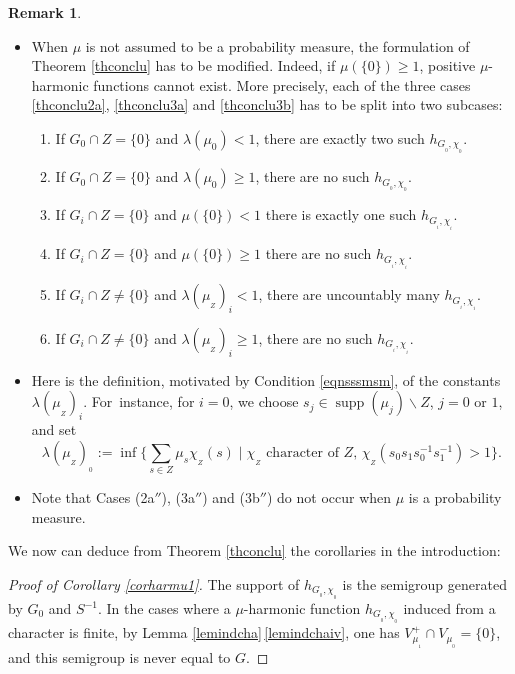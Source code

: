 \documentclass[11pt]{article}
\newcommand{\skpt}{\smallskip}
\numberwithin{equation}{section}
\DeclareMathOperator{\supp}{supp}
\theoremstyle{definition}
\newtheorem{Rem}[Thm]{Remark}
\let\la\lambda
\begin{document}
\enlargethispage{-\baselineskip}%
\pagebreak[2]
\skpt
\begin{Rem}
\label{remconclu}
\begin{itemize}
\item
When $\mu$ is not assumed to be a probability measure,
the formulation of Theorem \ref{thconclu} has to be modified.
Indeed, if $\mu (\{ 0\})\geq 1$,
positive $\mu$-harmonic functions cannot exist.
More precisely, each of the three cases \eqref{thconclu2a}, \eqref{thconclu3a} and \eqref{thconclu3b}
has to be split into two subcases:
\begin{enumerate}
\item[(2a$'$)] If $G_0\cap Z = \{ 0\}$ and $\la(\mu_0)< 1$,
there are exactly two such $h_{G_{_0},\chi_{_0}}$. 
\item[(2a$''$)] If $G_0\cap Z = \{ 0\}$ and $\la(\mu_0)\geq 1$,
there are no such $h_{G_{_0},\chi_{_0}}$.
\item[(3a$'$)] If $G_i\cap Z = \{ 0\}$ and $\mu(\{ 0\})< 1$
there is exactly one such $h_{G_{_i},\chi_{_i}}$.
\item[(3a$''$)] If $G_i\cap Z = \{ 0\}$ and $\mu(\{ 0\})\geq 1$
there are no such $h_{G_{_i},\chi_{_i}}$.
\item[(3b$'$)] If $G_i\cap Z\neq \{ 0\}$
and
$\la(\mu_{_Z})_i\!<\! 1$,\!
there are uncountably many $h_{G_{_i},\chi_{_i}}$.
\item[(3b$''$)] If $G_i\cap Z \neq \{ 0\}$ and
$\la(\mu_{_Z})_i\geq 1$,
there are no such $h_{G_{_i},\chi_{_i}}$.
\end{enumerate}
\item
Here is the definition,
motivated by Condition \eqref{eqnsssmsm}, of the constants $\la(\mu_{_Z})_i$.
For~instance, for $i=0$, we choose $s_j\in \supp(\mu_j)\smallsetminus Z$,
$j=0$ or $1$,
and set\vspace*{-3pt}\enlargethispage{.5\baselineskip}%
\[\textstyle
\la(\mu_{_Z})_{_0}:=\inf\bigl\{\sum_{s\in Z}\mu_s\chi_{_Z}(s)\mid \chi_{_Z}
\text{ character of $Z$, $\chi_{_Z}(s_0s_1s_0^{-1}s_1^{-1})>1$}\bigr\}.
\]
\item
Note that Cases (2a$''$), (3a$''$) and (3b$''$) do not occur
when $\mu$ is a probability measure.
\end{itemize}
\end{Rem}

We now can deduce from Theorem \ref{thconclu} the corollaries in the
introduction:

\begin{proof}[Proof of Corollary \ref{corharmu1}]
The support of $h_{G_{_0},\chi_{_0}}$
is the semigroup generated by $G_0$ and $S^{-1}$.
In the cases where a $\mu$-harmonic function
$h_{G_{_0},\chi_{_0}}$ induced from a character is finite,
by Lemma \ref{lemindcha}\,\eqref{lemindchaiv}, one has $V^+_{\mu_{_1}}\cap V_{\mu_{_0}}=\{0\}$,
and this semigroup is never equal to $G$.
\end{proof}
\end{document}
